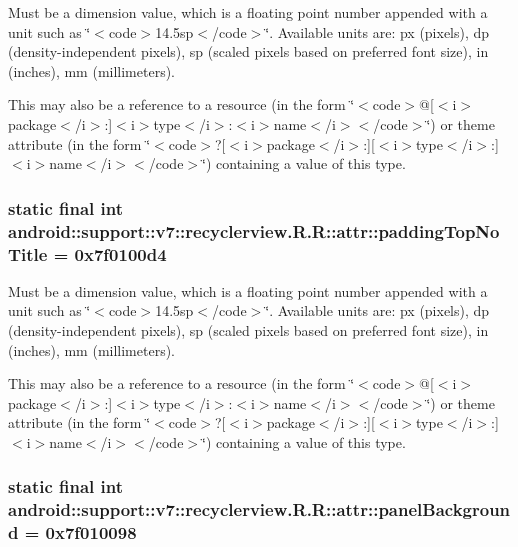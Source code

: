Must be a dimension value, which is a floating point number appended with a unit such as \char`\"{}$<$code$>$14.5sp$<$/code$>$\char`\"{}. Available units are: px (pixels), dp (density-independent pixels), sp (scaled pixels based on preferred font size), in (inches), mm (millimeters). 

This may also be a reference to a resource (in the form \char`\"{}$<$code$>$@\mbox{[}$<$i$>$package$<$/i$>$:\mbox{]}$<$i$>$type$<$/i$>$:$<$i$>$name$<$/i$>$$<$/code$>$\char`\"{}) or theme attribute (in the form \char`\"{}$<$code$>$?\mbox{[}$<$i$>$package$<$/i$>$:\mbox{]}\mbox{[}$<$i$>$type$<$/i$>$:\mbox{]}$<$i$>$name$<$/i$>$$<$/code$>$\char`\"{}) containing a value of this type. \hypertarget{classandroid_1_1support_1_1v7_1_1recyclerview_1_1_r_1_1attr_53355c91757b7b9d0eb59fd402a3fec1}{
\subsubsection[{paddingTopNoTitle}]{\setlength{\rightskip}{0pt plus 5cm}static final int android::support::v7::recyclerview.R.R::attr::paddingTopNoTitle = 0x7f0100d4}}
\label{classandroid_1_1support_1_1v7_1_1recyclerview_1_1_r_1_1attr_53355c91757b7b9d0eb59fd402a3fec1}


Must be a dimension value, which is a floating point number appended with a unit such as \char`\"{}$<$code$>$14.5sp$<$/code$>$\char`\"{}. Available units are: px (pixels), dp (density-independent pixels), sp (scaled pixels based on preferred font size), in (inches), mm (millimeters). 

This may also be a reference to a resource (in the form \char`\"{}$<$code$>$@\mbox{[}$<$i$>$package$<$/i$>$:\mbox{]}$<$i$>$type$<$/i$>$:$<$i$>$name$<$/i$>$$<$/code$>$\char`\"{}) or theme attribute (in the form \char`\"{}$<$code$>$?\mbox{[}$<$i$>$package$<$/i$>$:\mbox{]}\mbox{[}$<$i$>$type$<$/i$>$:\mbox{]}$<$i$>$name$<$/i$>$$<$/code$>$\char`\"{}) containing a value of this type. \hypertarget{classandroid_1_1support_1_1v7_1_1recyclerview_1_1_r_1_1attr_a54fd6ee37cdbdc76d4085882e200500}{
\subsubsection[{panelBackground}]{\setlength{\rightskip}{0pt plus 5cm}static final int android::support::v7::recyclerview.R.R::attr::panelBackground = 0x7f010098}}
\label{classandroid_1_1support_1_1v7_1_1recyclerview_1_1_r_1_1attr_a54fd6ee37cdbdc76d4085882e200500}


